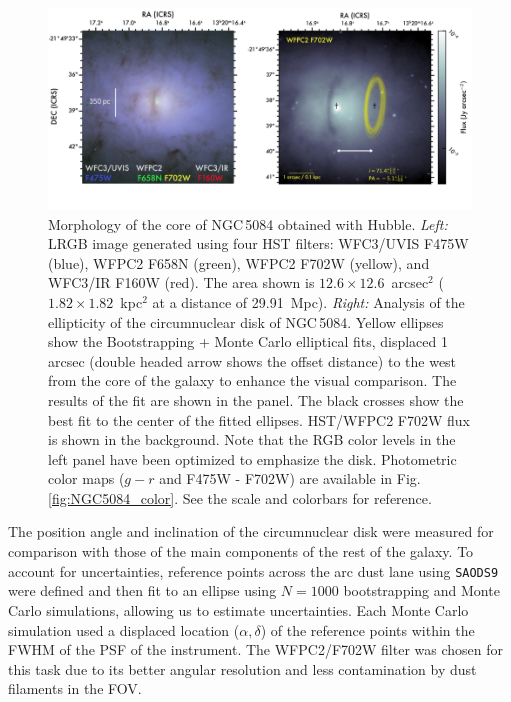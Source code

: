 \documentclass[modern]{CORE-AAS/aastex631}
\begin{document}
\begin{figure}[t!]
\begin{center}
\includegraphics[trim={0 160 0 0}, clip, width=\textwidth]{FIGURES/HST_Torus_model.png}
\caption{Morphology of the core of NGC\,5084 obtained with Hubble. \emph{Left:} LRGB image generated using four HST filters: WFC3/UVIS F475W (blue), WFPC2 F658N (green), WFPC2 F702W (yellow), and WFC3/IR F160W (red). The area shown is $12.6\times12.6$~arcsec$^2$ ($1.82\times1.82$~kpc$^2$ at a distance of 29.91~Mpc). \emph{Right:} Analysis of the ellipticity of the circumnuclear disk of NGC\,5084. Yellow ellipses show the Bootstrapping + Monte Carlo elliptical fits, displaced 1 arcsec (double headed arrow shows the offset distance) to the west from the core of the galaxy to enhance the visual comparison. The results of the fit are shown in the panel. The black crosses show the best fit to the center of the fitted ellipses. HST/WFPC2 F702W flux is shown in the background. Note that the RGB color levels in the left panel have been optimized to emphasize the disk. Photometric color maps ($g-r$ and F475W - F702W) are available in Fig.\,\ref{fig:NGC5084_color}. See the scale and colorbars for reference.} 
\label{fig:NGC5084_hst}
\end{center}
\end{figure}


The position angle and inclination of the circumnuclear disk were measured for comparison with those of the main components of the rest of the galaxy. To account for uncertainties, reference points across the arc dust lane using \texttt{SAODS9} were defined and then fit to an ellipse using $N=1000$ bootstrapping and Monte Carlo simulations, allowing us to estimate uncertainties. Each Monte Carlo simulation used a displaced location ($\alpha, \delta$) of the reference points within the FWHM of the PSF of the instrument. The WFPC2/F702W filter was chosen for this task due to its better angular resolution and less contamination by dust filaments in the FOV. \par 
\end{document}
